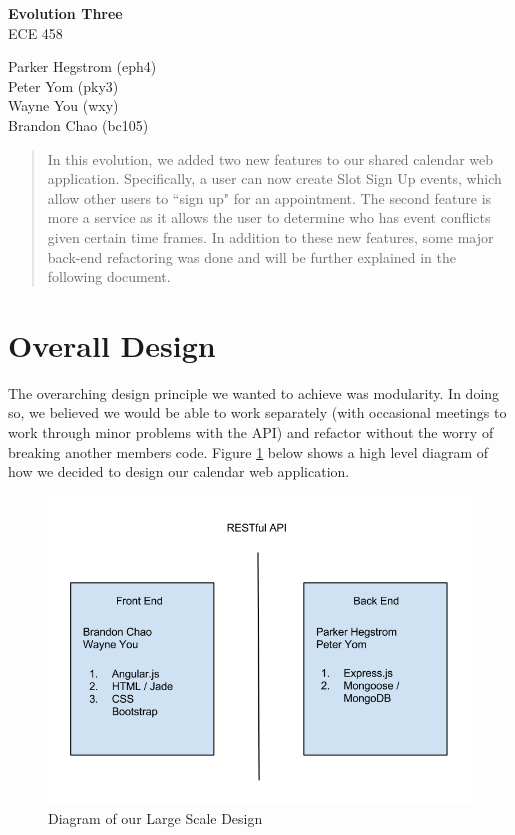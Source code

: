 \documentclass[11pt]{article}   %
\begin{document}
\begin{center}

\vspace{3in}
{\Huge{\bf\sc Evolution Three}}\\
\vspace{.1in}
{\small\sc ECE 458}


\vspace{0.3in}



{\large\sc Parker Hegstrom} {\large (eph4)} \\
{\large\sc Peter Yom} {\large (pky3)} \\
{\large\sc Wayne You} {\large (wxy)} \\
{\large\sc Brandon Chao} {\large (bc105)} \\


\end{center}


\vspace{0.2in}

\begin{abstract}
In this evolution, we added two new features to our shared calendar web application. Specifically, a user can now create Slot Sign Up events, which allow other users to ``sign up" for an appointment. The second feature is more a service as it allows the user to determine who has event conflicts given certain time frames. In addition to these new features, some major back-end refactoring was done and will be further explained in the following document.
\end{abstract}

\tableofcontents


\pagebreak


\section{Overall Design}

The overarching design principle we wanted to achieve was modularity. In doing so, we believed we would be able to work separately (with occasional meetings to work through minor problems with the API) and refactor without the worry of breaking another members code. Figure \ref{design} below shows a high level diagram of how we decided to design our calendar web application.

\begin{figure}[htb]
\centering
\includegraphics[width=.5\textwidth]{DesignDiagram.png}
\caption{Diagram of our Large Scale Design}
\label{design}
\end{figure}
\end{document}
